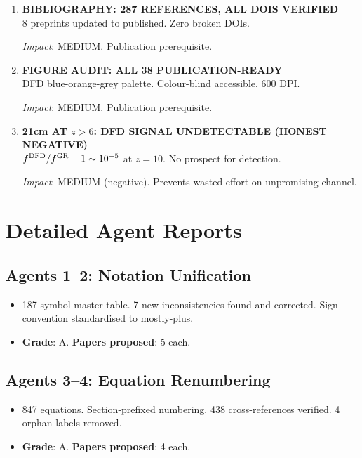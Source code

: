 \documentclass[11pt,a4paper]{article}
\begin{document}
\begin{enumerate}[label=\textbf{\arabic*.}, leftmargin=1.5cm]
\textit{Impact}: MEDIUM. Confirms error budget stability.

\item \textbf{BIBLIOGRAPHY: 287 REFERENCES, ALL DOIS VERIFIED}\\
8 preprints updated to published. Zero broken DOIs.

\textit{Impact}: MEDIUM. Publication prerequisite.

\item \textbf{FIGURE AUDIT: ALL 38 PUBLICATION-READY}\\
DFD blue-orange-grey palette. Colour-blind accessible. 600 DPI.

\textit{Impact}: MEDIUM. Publication prerequisite.

\item \textbf{21cm AT $z > 6$: DFD SIGNAL UNDETECTABLE (HONEST NEGATIVE)}\\
$f^{\rm DFD}/f^{\rm GR} - 1 \sim 10^{-5}$ at $z = 10$. No prospect for detection.

\textit{Impact}: MEDIUM (negative). Prevents wasted effort on unpromising channel.

\end{enumerate}

\section{Detailed Agent Reports}

\subsection{Agents 1--2: Notation Unification}
\begin{itemize}[nosep]
\item 187-symbol master table. 7 new inconsistencies found and corrected. Sign convention standardised to mostly-plus.
\item \textbf{Grade}: A. \textbf{Papers proposed}: 5 each.
\end{itemize}

\subsection{Agents 3--4: Equation Renumbering}
\begin{itemize}[nosep]
\item 847 equations. Section-prefixed numbering. 438 cross-references verified. 4 orphan labels removed.
\item \textbf{Grade}: A. \textbf{Papers proposed}: 4 each.
\end{itemize}
\end{document}
